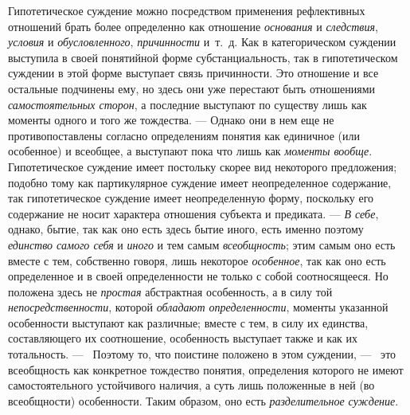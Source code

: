 \documentclass[twoside]{article}
\begin{document}
{{Гипотетическое суждение можно посредством применения
рефлективных отношений брать более определенно как отношение
{\em основания} и
{\em следствия},
{\em условия} и
{\em обусловленного},
{\em причинности} и~т.~д.
Как в категорическом суждении выступила в своей понятийной форме
субстанциальность, так в гипотетическом суждении в этой форме выступает
связь причинности. Это отношение и все остальные подчинены ему, но здесь
они уже перестают быть отношениями
{\em самостоятельных сторон},
а последние выступают по существу лишь как моменты одного и
того же тождества. — Однако они в нем еще не
противопоставлены согласно определениям понятия как единичное (или
особенное) и всеобщее, а выступают пока что лишь как
{\em моменты вообще}.
Гипотетическое суждение имеет постольку скорее вид некоторого
предложения; подобно тому как партикулярное суждение имеет неопределенное
содержание, так гипотетическое суждение имеет неопределенную форму,
поскольку его содержание не носит характера отношения субъекта и
предиката. — {\em В себе},
однако, бытие, так как оно есть здесь бытие иного, есть
именно поэтому {\em единство самого
себя} и {\em иного}
и тем самым
{\em всеобщность}; этим
самым оно есть вместе с тем, собственно говоря, лишь некоторое
{\em особенное}, так как
оно есть определенное и в своей определенности не только с собой
соотносящееся. Но положена здесь не
{\em простая} абстрактная
особенность, а в силу той
{\em непосредственности},
которой {\em обладают
определенности}, моменты указанной особенности выступают как
различные; вместе с тем, в силу их единства, составляющего их соотношение,
особенность выступает также и как их тотальность. —
\ Поэтому то, что поистине положено в этом суждении, —
\ это всеобщность как конкретное тождество понятия,
определения которого не имеют самостоятельного устойчивого наличия, а суть
лишь положенные в ней (во всеобщности) особенности. Таким образом, оно есть
{\em разделительное суждение}.

}}
\end{document}
